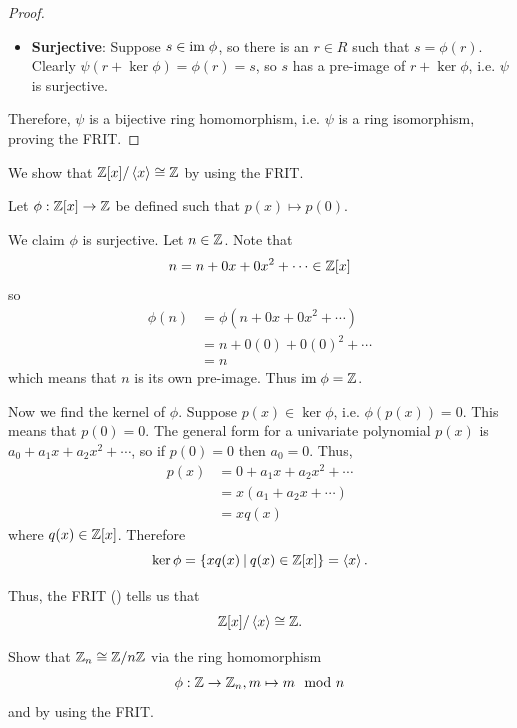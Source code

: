 \begin{proof}
\begin{itemize}
        \item \textbf{Surjective}: Suppose $s \in \mathrm{im}\;\phi$, so there is an $r \in R$ such that $s = \phi(r)$. Clearly $\psi(r + \ker\phi) = \phi(r) = s$, so $s$ has a pre-image of $r + \ker\phi$, i.e. $\psi$ is surjective.
    \end{itemize}
    Therefore, $\psi$ is a bijective ring homomorphism, i.e. $\psi$ is a ring isomorphism, proving the FRIT.
\end{proof}

\begin{example}
    We show that $\mathbb{Z}[x] / \left\langle x\right\rangle \cong \mathbb{Z}$ by using the FRIT.

    Let $\phi: \mathbb{Z}[x] \to \mathbb{Z}$ be defined such that $p(x) \mapsto p(0)$.

    We claim $\phi$ is surjective. Let $n \in \mathbb{Z}$. Note that
    \[
        n = n + 0x + 0x^2 + \cdots \in \mathbb{Z}[x]
    \]
    so
    \begin{align*}
        \phi(n) &= \phi(n + 0x + 0x^2 + \cdots)\\
        &= n + 0(0) + 0(0)^2 + \cdots\\
        &= n
    \end{align*}
    which means that $n$ is its own pre-image. Thus $\mathrm{im}\;\phi = \mathbb{Z}$.

    Now we find the kernel of $\phi$. Suppose $p(x) \in \ker\phi$, i.e. $\phi(p(x)) = 0$. This means that $p(0) = 0$. The general form for a univariate polynomial $p(x)$ is $a_0 + a_1x + a_2x^2 + \cdots$, so if $p(0) = 0$ then $a_0 = 0$. Thus,
    \begin{align*}
        p(x) &= 0 + a_1x + a_2x^2 + \cdots\\
        &= x(a_1 + a_2x + \cdots)\\
        &= xq(x)
    \end{align*}
    where $q(x) \in \mathbb{Z}[x]$. Therefore
    \[
        \ker\phi = \{xq(x) \vert q(x) \in \Z[x]\} = \princ{x}.
    \]

    Thus, the FRIT () tells us that
    \[
        \mathbb{Z}[x] / \left\langle x\right\rangle \cong \mathbb{Z}.
    \]
\end{example}
\begin{exercise}
    Show that $\mathbb{Z}_n \cong \mathbb{Z}/n\mathbb{Z}$ via the ring homomorphism
    \[
        \phi: \mathbb{Z} \to \mathbb{Z}_n, m \mapsto m \mod n
    \]
    and by using the FRIT.
\end{exercise}

